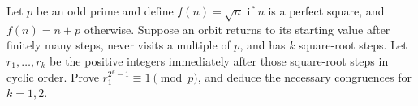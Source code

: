 Let $p$ be an odd prime and define $f(n)=\sqrt n$ if $n$ is a perfect square, and $f(n)=n+p$ otherwise. Suppose an orbit returns to its starting value after finitely many steps, never visits a multiple of $p$, and has $k$ square-root steps. Let $r_1,\ldots,r_k$ be the positive integers immediately after those square-root steps in cyclic order. Prove $r_1^{2^k-1}\equiv1\pmod p$, and deduce the necessary congruences for $k=1,2$.
